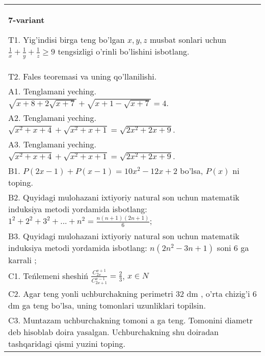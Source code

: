 \documentclass{article}
\begin{document}
\begin{tabular}{m{17cm}}
\textbf{7-variant}
\newline

T1. Yig'indisi birga teng bo'lgan \(x,y,z\) musbat sonlari uchun \(\frac{1}{x} + \frac{1}{y} + \frac{1}{z} \geq 9\) tengsizligi o'rinli bo'lishini isbotlang. \\
T2. Fales teoremasi va uning qo'llanilishi. \\
A1. Tenglamani yeching. \(\sqrt{x + 8 + 2\sqrt{x + 7}} + \sqrt{x + 1 - \sqrt{x + 7}} = 4\). \\
A2. Tenglamani yeching. \(\sqrt{x^{2} + x + 4} + \sqrt{x^{2} + x + 1} = \sqrt{2x^{2} + 2x + 9}\). \\
A3. Tenglamani yeching. \(\sqrt{x^{2} + x + 4} + \sqrt{x^{2} + x + 1} = \sqrt{2x^{2} + 2x + 9}\). \\
B1. \(P(2x - 1) + P(x - 1) = 10x^{2} - 12x + 2\) bo'lsa, \(P(x)\) ni toping. \\
B2. Quyidagi mulohazani ixtiyoriy natural son uchun matematik induksiya metodi yordamida isbotlang: \(1^{2} + 2^{2} + 3^{2} + ... + n^{2} = \frac{n(n + 1)(2n + 1)}{6}\); \\
B3. Quyidagi mulohazani ixtiyoriy natural son uchun matematik induksiya metodi yordamida isbotlang: \(n\left( 2n^{2} - 3n + 1 \right)\) soni 6 ga karrali ; \\
C1. Teńlemeni sheshiń \(\frac{C_{2x}^{x + 1}}{C_{2x + 1}^{x - 1}} = \frac{2}{3}\), \(x \in N\) \\
C2. Agar teng yonli uchburchakning perimetri 32 dm , o'rta chizig'i 6 dm ga teng bo'lsa, uning tomonlari uzunliklari topilsin. \\
C3. Muntazam uchburchakning tomoni a ga teng. Tomonini diametr deb hisoblab doira yasalgan. Uchburchakning shu doiradan tashqaridagi qismi yuzini toping. \\

\end{tabular}
\vspace{1cm}
\end{document}
